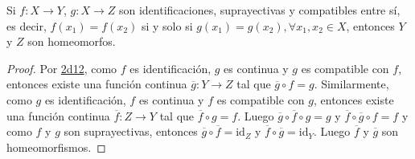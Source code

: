 
\begin{corollary}
Si $f : X \longrightarrow Y$, $g : X \longrightarrow Z$ son identificaciones, suprayectivas y compatibles entre sí, es decir, $f(x_1) = f(x_2)$ si y solo si $g(x_1) = g(x_2), \forall x_1, x_2 \in X$, entonces $Y$ y $Z$ son homeomorfos.
\end{corollary}

\begin{proof}
Por \hyperref[card:2d12]{\textsf{2d12}}, como $f$ es identificación, $g$ es continua y $g$ es compatible con $f$, entonces existe una función continua $\overline{g} : Y \longrightarrow Z$ tal que $\overline{g} \circ f = g$. Similarmente, como $g$ es identificación, $f$ es continua y $f$ es compatible con $g$, entonces existe una función continua $\overline{f} : Z \longrightarrow Y$ tal que $\overline{f} \circ g = f$. Luego $\overline{g} \circ \overline{f} \circ g = g$ y $\overline{f} \circ \overline{g} \circ f = f$ y como $f$ y $g$ son suprayectivas, entonces $\overline{g} \circ \overline{f} = \text{id}_{Z}$ y $\overline{f} \circ \overline{g} =  \text{id}_{Y}$. Luego $\overline{f}$ y $\overline{g}$ son homeomorfismos.
\end{proof}
